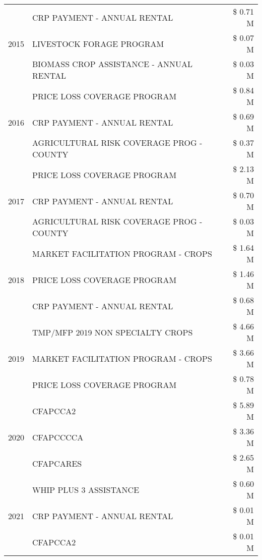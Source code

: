 \begin{tabular}{llr}
\multirow[t]{3}{*}{2015} & CRP PAYMENT - ANNUAL RENTAL & \$ 0.71 M \\
 & LIVESTOCK FORAGE PROGRAM & \$ 0.07 M \\
 & BIOMASS CROP ASSISTANCE - ANNUAL RENTAL & \$ 0.03 M \\
\cline{1-3}
\multirow[t]{3}{*}{2016} & PRICE LOSS COVERAGE PROGRAM & \$ 0.84 M \\
 & CRP PAYMENT - ANNUAL RENTAL & \$ 0.69 M \\
 & AGRICULTURAL RISK COVERAGE PROG - COUNTY & \$ 0.37 M \\
\cline{1-3}
\multirow[t]{3}{*}{2017} & PRICE LOSS COVERAGE PROGRAM & \$ 2.13 M \\
 & CRP PAYMENT - ANNUAL RENTAL & \$ 0.70 M \\
 & AGRICULTURAL RISK COVERAGE PROG - COUNTY & \$ 0.03 M \\
\cline{1-3}
\multirow[t]{3}{*}{2018} & MARKET FACILITATION PROGRAM - CROPS & \$ 1.64 M \\
 & PRICE LOSS COVERAGE PROGRAM & \$ 1.46 M \\
 & CRP PAYMENT - ANNUAL RENTAL & \$ 0.68 M \\
\cline{1-3}
\multirow[t]{3}{*}{2019} & TMP/MFP 2019 NON SPECIALTY CROPS & \$ 4.66 M \\
 & MARKET FACILITATION PROGRAM - CROPS & \$ 3.66 M \\
 & PRICE LOSS COVERAGE PROGRAM & \$ 0.78 M \\
\cline{1-3}
\multirow[t]{3}{*}{2020} & CFAPCCA2 & \$ 5.89 M \\
 & CFAPCCCCA & \$ 3.36 M \\
 & CFAPCARES & \$ 2.65 M \\
\cline{1-3}
\multirow[t]{3}{*}{2021} & WHIP PLUS 3 ASSISTANCE & \$ 0.60 M \\
 & CRP PAYMENT - ANNUAL RENTAL & \$ 0.01 M \\
 & CFAPCCA2 & \$ 0.01 M \\
\cline{1-3}
\bottomrule
\end{tabular}
